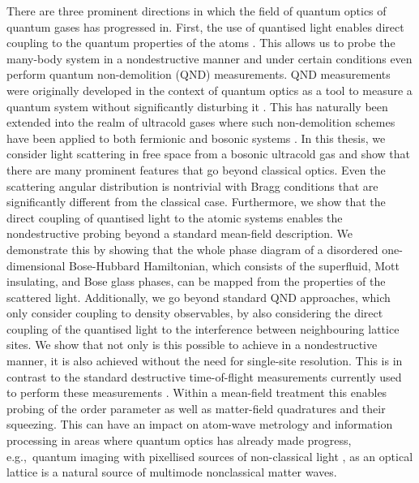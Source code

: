 There are three prominent directions in which the field of quantum
optics of quantum gases has progressed in. First, the use of quantised
light enables direct coupling to the quantum properties of the atoms
\cite{mekhov2012, mekhov2007prl, mekhov2007pra, mekhov2007NP,
  LP2009}. This allows us to probe the many-body system in a
nondestructive manner and under certain conditions even perform
quantum non-demolition (QND) measurements. QND measurements were
originally developed in the context of quantum optics as a tool to
measure a quantum system without significantly disturbing it
\cite{braginsky1977, unruh1978, brune1990, brune1992}. This has
naturally been extended into the realm of ultracold gases where such
non-demolition schemes have been applied to both fermionic
\cite{eckert2008qnd, roscilde2009} and bosonic systems
\cite{hauke2013, rogers2014}. In this thesis, we consider light
scattering in free space from a bosonic ultracold gas and show that
there are many prominent features that go beyond classical
optics. Even the scattering angular distribution is nontrivial with
Bragg conditions that are significantly different from the classical
case. Furthermore, we show that the direct coupling of quantised light
to the atomic systems enables the nondestructive probing beyond a
standard mean-field description. We demonstrate this by showing that
the whole phase diagram of a disordered one-dimensional Bose-Hubbard
Hamiltonian, which consists of the superfluid, Mott insulating, and
Bose glass phases, can be mapped from the properties of the scattered
light. Additionally, we go beyond standard QND approaches, which only
consider coupling to density observables, by also considering the
direct coupling of the quantised light to the interference between
neighbouring lattice sites. We show that not only is this possible to
achieve in a nondestructive manner, it is also achieved without the
need for single-site resolution. This is in contrast to the standard
destructive time-of-flight measurements currently used to perform
these measurements \cite{miyake2011}. Within a mean-field treatment
this enables probing of the order parameter as well as matter-field
quadratures and their squeezing. This can have an impact on atom-wave
metrology and information processing in areas where quantum optics has
already made progress, e.g.,~quantum imaging with pixellised sources
of non-classical light \cite{golubev2010, kolobov1999}, as an optical
lattice is a natural source of multimode nonclassical matter waves.

